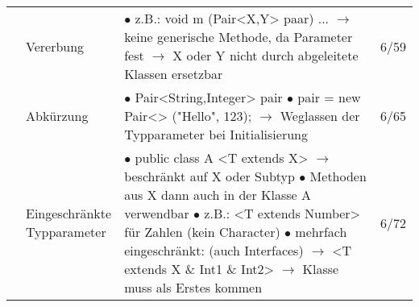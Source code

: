 \documentclass[11pt,a4paper]{article}
\begin{document}
\begin{center}
\begin{longtable}[h]{ | p{2.3cm} | p{2.3cm} | p{12.6cm} | p{1.2cm} | }
	& Vererbung & \makecell[l]{$\bullet$ z.B.: void m (Pair<X,Y> paar) ... \\ 
	\hspace{0.4cm} $\rightarrow$ keine generische Methode, da Parameter fest \\ 
	\hspace{0.4cm} $\rightarrow$ X oder Y nicht durch abgeleitete Klassen ersetzbar}  & 6/59 \\ \cline{2-4}
	
	& Abkürzung & \makecell[l]{$\bullet$ Pair<String,Integer> pair \\ $\bullet$ pair = new Pair<> ("Hello", 123); \\
	$\rightarrow$ Weglassen der Typparameter bei Initialisierung}  & 6/65 \\ \cline{2-4}
	
	& \makecell[l]{Eingeschränkte \\ Typparameter} & \makecell[l]{$\bullet$ public class A <T extends X> $\rightarrow$ beschränkt auf X oder
	Subtyp \\ $\bullet$ Methoden aus X dann auch in der Klasse A verwendbar \\ 
	$\bullet$ z.B.: <T extends Number> für Zahlen (kein Character) \\
	$\bullet$ mehrfach eingeschränkt: (auch Interfaces) \\ \hspace{0.4cm} $\rightarrow$ <T extends X \& Int1 \& Int2> \\
	\hspace{0.4cm} $\rightarrow$ Klasse muss als Erstes kommen }  & 6/72 \\ \cline{2-4}
	 

\end{longtable}
\end{center}
\end{document}
